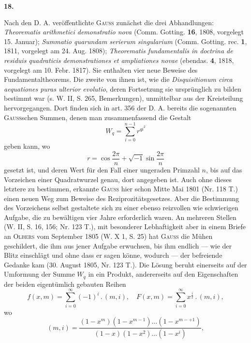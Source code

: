 \begin{center}\end{center}
\begin{center}\bfseries 18.\end{center}
\noindent\hspace*{\parindent}Nach den D. A. veröffentlichte \textsc{Gauss} zunächst die drei Abhandlungen: \textit{Theorematis arithmetici demonstratio nova} (Comm. Gotting. \textbf{16}, 1808, vorgelegt 15. Januar); \textit{Summatio quarundam serierum singularium} (Comm. Gotting. rec. \textbf{1}, 1811, vorgelegt am 24. Aug. 1808); \textit{Theorematis fundamentalis in doctrina de residuis quadraticis demonstrationes et ampliationes novae} (ebendas. \textbf{4}, 1818, vorgelegt am 10. Febr. 1817). Sie enthalten vier neue Beweise des Fundamentaltheorems. Die zweite von ihnen ist, wie die \textit{Disquisitionum circa aequationes puras ulterior evolutio}, deren Fortsetzung sie ursprünglich zu bilden bestimmt war (s. W. II, S. 265, Bemerkungen), unmittelbar aus der Kreisteilung hervorgegangen. Dort finden sich in art. 356 der D. A. bereits die sogenannten \textsc{Gauss}schen Summen, denen man zusammenfassend die Gestalt
\[
W_q=\sum_{i=0}^{n-1}r^{qi^2}
\]
geben kann, wo
\[
r=\cos\frac{2\pi}{n}+\sqrt{-1}\sin\frac{2\pi}{n}
\]
gesetzt ist, und deren Wert für den Fall einer ungeraden Primzahl \(n\), bis auf das Vorzeichen einer Quadratwurzel genau, dort angegeben ist. Auch
\newpage{}
\noindent ohne dieses letztere zu bestimmen, erkannte \textsc{Gauss} hier schon Mitte Mai 1801 (Nr. 118 T.) einen neuen Weg zum Beweise des Reziprozitätsgesetzes. Aber die Bestimmung des Vorzeichens selbst gestaltete sich zu einer ebenso reizvollen wie schwierigen Aufgabe, die zu bewältigen vier Jahre erforderlich waren. An mehreren Stellen (W. II, S. 16, 156; Nr. 123 T.), mit besonderer Lebhaftigkeit aber in einem Briefe an \textsc{Olbers} vom September 1805 (W. X 1, S. 25) hat \textsc{Gauss} die Mühen geschildert, die ihm aus jener Aufgabe erwuchsen, bis ihm endlich — wie der Blitz einschlägt und ohne dass er sagen könne, wodurch — der befreiende Gedanke kam (30. August 1805, Nr. 123 T.). Die Lösung beruht einerseits auf der Umformung der Summe \(W_q\) in ein Produkt, andererseits auf den Eigenschaften der beiden eigentümlich gebauten Reihen
\[
f(x,m)=\sum_{i=0}^{\infty}(-1)^i\mathbin{.}(m,i),\quad F(x,m)=\sum_{i=0}^{\infty}x^{\frac{i}{2}}\mathbin{.}(m,i),
\]
wo
\[
(m,i)=\frac{(1-x^m)(1-x^{m-1})\ldots(1-x^{m-+1})}{(1-x)(1-x^2)\ldots(1-x^i)},
\]
